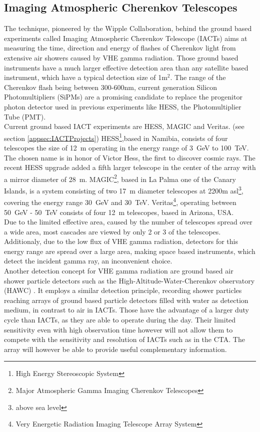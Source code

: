 \documentclass[12pt,article,type=msc,colorback,accentcolor=tud9c]{tudthesis}
\begin{document}
\subsection{Imaging Atmospheric Cherenkov Telescopes}
The technique, pioneered by the Wipple Collaboration, behind the ground based experiments called Imaging Atmospheric Cherenkov Telescope (IACTs) aims at measuring the time, direction and energy of flashes of Cherenkov light from extensive air showers caused by VHE gamma radiation. Those ground based instruments have a much larger effective detection area than any satellite based instrument, which have a typical detection size of 1m$^2$. The range of the Cherenkov flash being between 300-600nm, current generation Silicon Photomultipliers (SiPMs) are a promising candidate to replace the progenitor photon detector used in previous experiments like HESS, the Photomultiplier Tube (PMT).\\

Current ground based IACT experiments are HESS, MAGIC and Veritas. (see section {\ref{appsec:IACTProjects}}) HESS\footnote{High Energy Stereoscopic System},based in Namibia, consists of four telescopes the size of 12~m operating in the energy range of 3~GeV to 100~TeV. The chosen name is in honor of Victor Hess, the first to discover cosmic rays. The recent HESS upgrade added a fifth larger telescope in the center of the array with a mirror diameter of 28~m. MAGIC\footnote{Major Atmospheric Gamma Imaging Cherenkov Telescopes}, based in La Palma one of the Canary Islands, is a system consisting of two 17~m diameter telescopes at 2200m asl\footnote{above sea level}, covering the energy range 30~GeV and 30~TeV. Veritas\footnote{Very Energetic Radiation Imaging Telescope Array System}, operating between 50~GeV - 50~TeV consists of four 12~m telescopes, based in Arizona, USA. \\

Due to the limited effective area, caused by the number of telescopes spread over a wide area, most cascades are viewed by only 2 or 3 of the telescopes. Additionaly, due to the low flux of VHE gamma radiation, detectors for this energy range are spread over a large area, making space based instruments, which detect the incident gamma ray, an inconvenient choice.\\ 

Another detection concept for VHE gamma radiation are ground based air shower particle detectors such as the High-Altitude-Water-Cherenkov observatory (HAWC) \cite{HAWC}. It employs a similar detection principle, recording shower particles reaching arrays of ground based particle detectors filled with water as detection medium, in contrast to air in IACTs. Those have the advantage of a larger duty cycle than IACTs, as they are able to operate during the day. Their limited sensitivity even with high observation time however will not allow them to compete with the sensitivity and resolution of IACTs such as in the CTA. The array will however be able to provide useful complementary information. 
\end{document}
